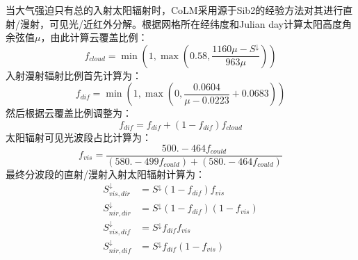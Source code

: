 当大气强迫只有总的入射太阳辐射时，CoLM采用源于Sib2的经验方法对其进行直射/漫射，可见光/近红外分解。根据网格所在经纬度和Julian
day计算太阳高度角余弦值\(\mu\)，由此计算云覆盖比例：
%
\begin{equation}
f_{cloud} = \min\left( 1,\max\left( 0.58,\frac{1160\mu - S^{\downarrow}}{963\mu} \right) \right)
\end{equation}
%
入射漫射辐射比例首先计算为：
%
\begin{equation}
f_{dif} = \min\left( 1,\max\left( 0,\frac{0.0604}{\mu - 0.0223} + 0.0683 \right) \right)
\end{equation}
%
然后根据云覆盖比例调整为：
%
\begin{equation}
f_{dif} = f_{dif} + \left( 1 - f_{dif} \right)f_{cloud}
\end{equation}
%
太阳辐射可见光波段占比计算为：
%
\begin{equation}
f_{vis} = \frac{500. - {464f}_{could}}{\left( 580. - {499f}_{could} \right) + \left( 580. - {464f}_{could} \right)}
\end{equation}
%
最终分波段的直射/漫射入射太阳辐射计算为：
%
\begin{equation}
\begin{aligned}
S_{vis,dir}^{\downarrow} &= S^{\downarrow}\left( 1 - f_{dif} \right)f_{vis}\\
%
S_{nir,dir}^{\downarrow} &= S^{\downarrow}\left( 1 - f_{dif} \right)\left( 1 - f_{vis} \right)\\
%
S_{vis,dif}^{\downarrow} &= S^{\downarrow}f_{dif}f_{vis}\\
%
S_{nir,dif}^{\downarrow} &= S^{\downarrow}f_{dif}\left( 1 - f_{vis} \right)
\end{aligned}
\end{equation}
%

